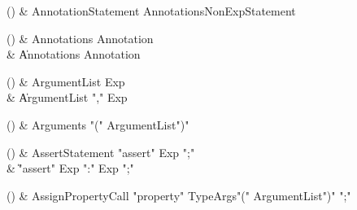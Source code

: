 \begin{bbgrammarappendix}

() & AnnotationStatement \label{prod:AnnotationStatement}  \: Annotations\opt NonExpStatement  \\


\end{bbgrammarappendix}

\begin{bbgrammarappendix}

() & Annotations \label{prod:Annotations}  \: Annotation  \\

 &    \| Annotations Annotation \\

\end{bbgrammarappendix}

\begin{bbgrammarappendix}

() & ArgumentList \label{prod:ArgumentList}  \: Exp  \\

 &    \| ArgumentList \xcd"," Exp \\

\end{bbgrammarappendix}

\begin{bbgrammarappendix}

() & Arguments \label{prod:Arguments}  \: \xcd"(" ArgumentList\opt \xcd")"  \\


\end{bbgrammarappendix}

\begin{bbgrammarappendix}

() & AssertStatement \label{prod:AssertStatement}  \: \xcd"assert" Exp \xcd";"  \\

 &    \| \xcd"assert" Exp  \xcd":" Exp  \xcd";" \\

\end{bbgrammarappendix}

\begin{bbgrammarappendix}

() & AssignPropertyCall \label{prod:AssignPropertyCall}  \: \xcd"property" TypeArgs\opt \xcd"(" ArgumentList\opt \xcd")" \xcd";"  \\


\end{bbgrammarappendix}

